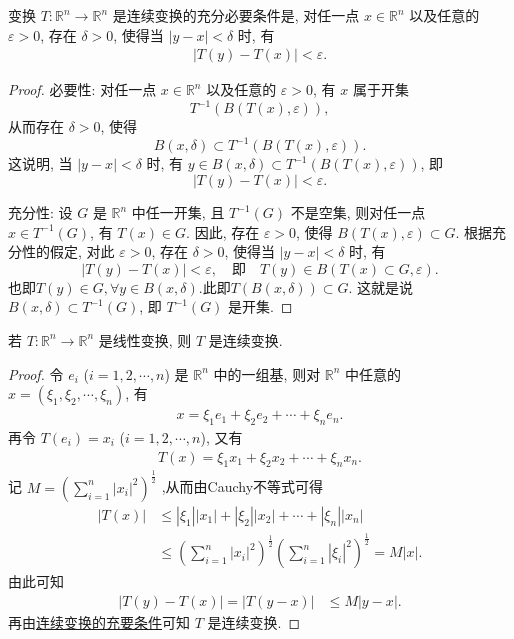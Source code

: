 \documentclass[../../main.tex]{subfiles}%
\begin{document}
\begin{theorem}[连续变换的充要条件]\label{theorem:连续变换的充要条件}
变换 $T:\mathbb{R}^n\to\mathbb{R}^n$ 是连续变换的充分必要条件是, 对任一点 $x\in\mathbb{R}^n$ 以及任意的 $\varepsilon>0$, 存在 $\delta>0$, 使得当 $|y - x|<\delta$ 时, 有
\begin{align}
|T(y) - T(x)|<\varepsilon.\label{eq:thm221}
\end{align}
\end{theorem}
\begin{proof}

{\heiti 必要性:} 对任一点 $x\in\mathbb{R}^n$ 以及任意的 $\varepsilon>0$, 有 $x$ 属于开集
\[
T^{-1}(B(T(x),\varepsilon)),
\]
从而存在 $\delta>0$, 使得
\[
B(x,\delta)\subset T^{-1}(B(T(x),\varepsilon)).
\]
这说明, 当 $|y - x|<\delta$ 时, 有 $y\in B(x,\delta)\subset T^{-1}(B(T(x),\varepsilon))$, 即
\[
|T(y) - T(x)|<\varepsilon.
\]

{\heiti 充分性:} 设 $G$ 是 $\mathbb{R}^n$ 中任一开集, 且 $T^{-1}(G)$ 不是空集, 则对任一点 $x\in T^{-1}(G)$, 有 $T(x)\in G$. 因此, 存在 $\varepsilon>0$, 使得 $B(T(x),\varepsilon)\subset G$. 根据充分性的假定, 对此 $\varepsilon>0$, 存在 $\delta>0$, 使得当 $|y - x|<\delta$ 时, 有
\[
|T(y) - T(x)|<\varepsilon,\quad \text{即}\quad T(y)\in B(T(x)\subset G,\varepsilon).
\]
也即$T(y)\in G,\forall y\in B(x,\delta)$.此即$T(B(x,\delta))\subset G$.
这就是说 $B(x,\delta)\subset T^{-1}(G)$, 即 $T^{-1}(G)$ 是开集. 

\end{proof}

\begin{proposition}
若 $T:\mathbb{R}^n\to\mathbb{R}^n$ 是线性变换, 则 $T$ 是连续变换.
\end{proposition}
\begin{proof}

令 $e_i$ ($i = 1,2,\cdots,n$) 是 $\mathbb{R}^n$ 中的一组基, 则对 $\mathbb{R}^n$ 中任意的 $x = (\xi_1,\xi_2,\cdots,\xi_n)$, 有
\begin{align*}
x = \xi_1e_1 + \xi_2e_2 + \cdots + \xi_ne_n.
\end{align*}
再令 $T(e_i) = x_i$ ($i = 1,2,\cdots,n$), 又有
\begin{align*}
T(x) = \xi_1x_1 + \xi_2x_2 + \cdots + \xi_nx_n.
\end{align*}
记 $M = \left(\sum_{i = 1}^{n}|x_i|^2\right)^{\frac{1}{2}}$ ,从而由Cauchy不等式可得
\begin{align*}
|T(x)|&\leqslant|\xi_1||x_1| + |\xi_2||x_2| + \cdots + |\xi_n||x_n|\\
&\leqslant\left(\sum_{i = 1}^{n}|x_i|^2\right)^{\frac{1}{2}}\left(\sum_{i = 1}^{n}|\xi_i|^2\right)^{\frac{1}{2}} = M|x|.
\end{align*}
由此可知
\begin{align*}
|T(y) - T(x)| = |T(y - x)|&\leqslant M|y - x|.
\end{align*}
再由\hyperref[theorem:连续变换的充要条件]{连续变换的充要条件}可知 $T$ 是连续变换. 

\end{proof}
\end{document}
